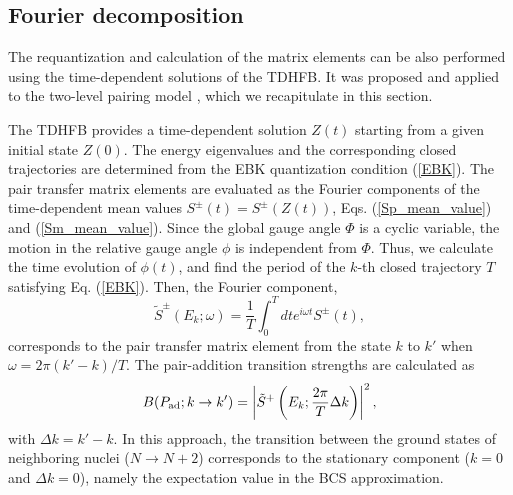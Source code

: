 \documentclass[11pt]{book} %
\begin{document}
\subsection{Fourier decomposition}
\label{sec:Fourier}

The requantization and calculation of the matrix elements can be also
performed using the time-dependent solutions of the TDHFB.
It was proposed and applied to the two-level pairing model \cite{CDS84},
which we recapitulate in this section.

The TDHFB provides a time-dependent solution $Z(t)$ starting from
a given initial state $Z(0)$.
The energy eigenvalues and the corresponding closed trajectories
are determined from the EBK quantization condition (\ref{EBK}).
The pair transfer matrix elements are evaluated as the Fourier components
of the time-dependent mean values $S^\pm(t)=S^\pm(Z(t))$,
Eqs. (\ref{Sp_mean_value}) and (\ref{Sm_mean_value}).
Since the global gauge angle $\Phi$ is a cyclic variable,
the motion in the relative gauge angle $\phi$ is independent from $\Phi$.
Thus, we calculate the time evolution of $\phi(t)$, and
find the period of the $k$-th closed trajectory $T$
satisfying Eq. (\ref{EBK}).
Then, the Fourier component,
\begin{equation}
	\tilde{S}^\pm(E_k; \omega) = \frac{1}{T}\int_0^T dt
	e^{i\omega t} S^\pm(t) ,
\label{Fourier_decomposition}
\end{equation}
corresponds to the pair transfer matrix element from the state $k$ to $k'$
when $\omega=2\pi (k'-k)/T$.
The pair-addition transition strengths are calculated as
\begin{equation}
	B(P_{\rm ad};k\rightarrow k') 
	= \left|\tilde{S}^+\left(E_k;\frac{2\pi}{T}\Delta k \right) \right|^2 ,
\end{equation}
with $\Delta k=k'-k$.
In this approach, the transition between the ground states of
neighboring nuclei ($N\rightarrow N+2$) corresponds to
the stationary component ($k=0$ and $\Delta k=0$),
namely the expectation value in the BCS approximation.
\end{document}
